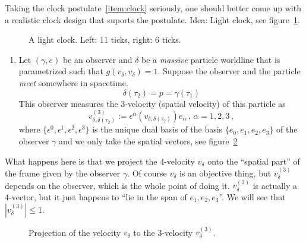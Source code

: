 Taking the clock postulate~\ref{item:clock} seriously,
one should better come up with a realistic clock design that suports the postulate.
Idea: Light clock, see figure~\ref{fig:lightClock}.
\begin{figure}[tbh]
    \centering{}
    
    \caption{A light clock. Left: 11 ticks, right: 6 ticks.}
    \label{fig:lightClock}
\end{figure}
\begin{enumerate}[resume, label=(\subscript{P}{{\arabic*}})]
    \item Let $(\gamma, e)$ be an observer and $\delta$ be a \textit{massive} particle worldline
        that is parametrized such that $g(v_\delta, v_\delta)=1$.
        Suppose the observer and the particle \textit{meet} somewhere in spacetime.
        \begin{equation}
            \delta(\tau_2) = p = \gamma(\tau_1)
        \end{equation}
        This observer measures the 3-velocity (spatial velocity) of this particle as 
        \begin{equation}
            v^{(3)}_{\delta, \delta(\tau_2)} := \epsilon^\alpha\left(v_{\delta, \delta(\tau_2)}\right)e_\alpha\,,
            \, \alpha = 1,2,3\,,
        \end{equation}
        where $\{\epsilon^0, \epsilon^1, \epsilon^2, \epsilon^3\}$ is the unique dual basis
        of the basis $\{e_0, e_1, e_2, e_3\}$ of the observer $\gamma$ and we only take the spatial vectors,
        see figure~\ref{fig:3velocity}
        \label{item:3velocity}
\end{enumerate}
\begin{note}
    What happens here is that we project the 4-velocity $v_\delta$ onto the ``spatial part'' of the
    frame given by the observer $\gamma$.
    Of course $v_\delta$ is an objective thing, but $v_\delta^{(3)}$ depends on the observer,
    which is the whole point of doing it.
    $v_\delta^{(3)}$ is actually a 4-vector, but it just happens to ``lie in the span of $e_1, e_2, e_3$''.
    We will see that $|v_\delta^{(3)}|\leq 1$.
\end{note}
\begin{figure}[tbh]
    \centering\def\svgwidth{\columnwidth}
    
    \caption{Projection of the velocity $v_\delta$ to the 3-velocity $v_\delta^{(3)}$.}
    \label{fig:3velocity}
\end{figure}
